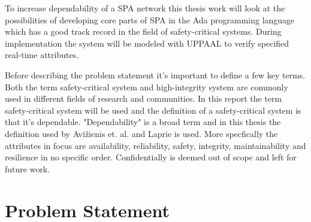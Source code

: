 
To increase dependability of a SPA network this thesis work will look at the
possibilities of developing core parts of SPA in the Ada programming language
which has a good track record in the field of safety-critical systems.
During implementation the system will be modeled with UPPAAL to verify
specified real-time attributes.

Before describing the problem statement it's important to define a few key
terms. Both the term safety-critical system and high-integrity system are
commonly used in different fields of research and communities. In this report
the term safety-critical system will be used and the definition of a
safety-critical system is that it's dependable.  "Dependability" is a broad
term and in this thesis the definition used by Avi\v{z}ienis et. al.
\cite{avizienis2004} and Laprie \cite{laprie2008} is used. More specfically the
attributes in focus are availability, reliability, safety, integrity,
maintainability and resilience in no specific order.  Confidentially is deemed
out of scope and left for future work.

\section{Problem Statement}
% 
% 

